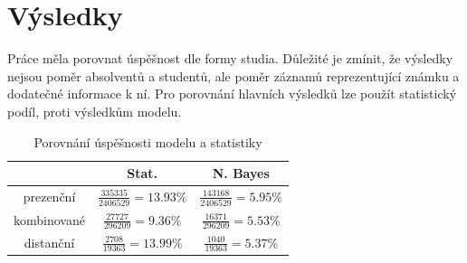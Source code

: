 \documentclass[12pt, letterpaper]{article}
\begin{document}
\section{Výsledky}
Práce měla porovnat úspěšnost dle formy studia. Důležité je zmínit, že výsledky nejsou poměr absolventů a studentů, 
ale poměr záznamů reprezentující známku a dodatečné informace k ní. Pro porovnání hlavních výsledků lze použít 
statistický podíl, proti výsledkům modelu.
\begin{table}[H]
    \begin{center}
        \begin{tabular}{ | c || c | c | }
            \hline
                        & Stat.     & N. Bayes    \\
            \hline \hline
            prezenční   & $\frac{335335}{2406529} = 13.93\%$    & $\frac{143168}{2406529} = 5.95\%$ \\
            \hline
            kombinované & $\frac{27727}{296209} = 9.36\%$       & $\frac{16371}{296209} = 5.53\%$   \\
            \hline
            distanční   & $\frac{2708}{19363} = 13.99\%$        & $\frac{1040}{19363} = 5.37\%$     \\
            \hline
        \end{tabular}
        \caption{Porovnání úspěšnosti modelu a statistiky}
        \label{table:main_result}
    \end{center}
\end{table}
\end{document}
